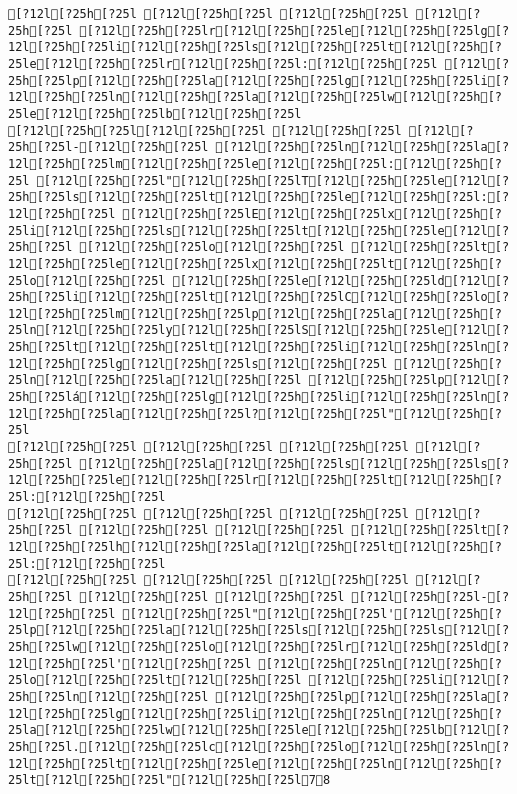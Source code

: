 \documentclass{scrartcl}
\begin{document}
\begin{Verbatim}
[?12l[?25h[?25l [?12l[?25h[?25l [?12l[?25h[?25l [?12l[?25h[?25l [?12l[?25h[?25lr[?12l[?25h[?25le[?12l[?25h[?25lg[?12l[?25h[?25li[?12l[?25h[?25ls[?12l[?25h[?25lt[?12l[?25h[?25le[?12l[?25h[?25lr[?12l[?25h[?25l:[?12l[?25h[?25l [?12l[?25h[?25lp[?12l[?25h[?25la[?12l[?25h[?25lg[?12l[?25h[?25li[?12l[?25h[?25ln[?12l[?25h[?25la[?12l[?25h[?25lw[?12l[?25h[?25le[?12l[?25h[?25lb[?12l[?25h[?25l
[?12l[?25h[?25l[?12l[?25h[?25l [?12l[?25h[?25l [?12l[?25h[?25l-[?12l[?25h[?25l [?12l[?25h[?25ln[?12l[?25h[?25la[?12l[?25h[?25lm[?12l[?25h[?25le[?12l[?25h[?25l:[?12l[?25h[?25l [?12l[?25h[?25l"[?12l[?25h[?25lT[?12l[?25h[?25le[?12l[?25h[?25ls[?12l[?25h[?25lt[?12l[?25h[?25le[?12l[?25h[?25l:[?12l[?25h[?25l [?12l[?25h[?25lE[?12l[?25h[?25lx[?12l[?25h[?25li[?12l[?25h[?25ls[?12l[?25h[?25lt[?12l[?25h[?25le[?12l[?25h[?25l [?12l[?25h[?25lo[?12l[?25h[?25l [?12l[?25h[?25lt[?12l[?25h[?25le[?12l[?25h[?25lx[?12l[?25h[?25lt[?12l[?25h[?25lo[?12l[?25h[?25l [?12l[?25h[?25le[?12l[?25h[?25ld[?12l[?25h[?25li[?12l[?25h[?25lt[?12l[?25h[?25lC[?12l[?25h[?25lo[?12l[?25h[?25lm[?12l[?25h[?25lp[?12l[?25h[?25la[?12l[?25h[?25ln[?12l[?25h[?25ly[?12l[?25h[?25lS[?12l[?25h[?25le[?12l[?25h[?25lt[?12l[?25h[?25lt[?12l[?25h[?25li[?12l[?25h[?25ln[?12l[?25h[?25lg[?12l[?25h[?25ls[?12l[?25h[?25l [?12l[?25h[?25ln[?12l[?25h[?25la[?12l[?25h[?25l [?12l[?25h[?25lp[?12l[?25h[?25lá[?12l[?25h[?25lg[?12l[?25h[?25li[?12l[?25h[?25ln[?12l[?25h[?25la[?12l[?25h[?25l?[?12l[?25h[?25l"[?12l[?25h[?25l
[?12l[?25h[?25l [?12l[?25h[?25l [?12l[?25h[?25l [?12l[?25h[?25l [?12l[?25h[?25la[?12l[?25h[?25ls[?12l[?25h[?25ls[?12l[?25h[?25le[?12l[?25h[?25lr[?12l[?25h[?25lt[?12l[?25h[?25l:[?12l[?25h[?25l
[?12l[?25h[?25l [?12l[?25h[?25l [?12l[?25h[?25l [?12l[?25h[?25l [?12l[?25h[?25l [?12l[?25h[?25l [?12l[?25h[?25lt[?12l[?25h[?25lh[?12l[?25h[?25la[?12l[?25h[?25lt[?12l[?25h[?25l:[?12l[?25h[?25l
[?12l[?25h[?25l [?12l[?25h[?25l [?12l[?25h[?25l [?12l[?25h[?25l [?12l[?25h[?25l [?12l[?25h[?25l [?12l[?25h[?25l-[?12l[?25h[?25l [?12l[?25h[?25l"[?12l[?25h[?25l'[?12l[?25h[?25lp[?12l[?25h[?25la[?12l[?25h[?25ls[?12l[?25h[?25ls[?12l[?25h[?25lw[?12l[?25h[?25lo[?12l[?25h[?25lr[?12l[?25h[?25ld[?12l[?25h[?25l'[?12l[?25h[?25l [?12l[?25h[?25ln[?12l[?25h[?25lo[?12l[?25h[?25lt[?12l[?25h[?25l [?12l[?25h[?25li[?12l[?25h[?25ln[?12l[?25h[?25l [?12l[?25h[?25lp[?12l[?25h[?25la[?12l[?25h[?25lg[?12l[?25h[?25li[?12l[?25h[?25ln[?12l[?25h[?25la[?12l[?25h[?25lw[?12l[?25h[?25le[?12l[?25h[?25lb[?12l[?25h[?25l.[?12l[?25h[?25lc[?12l[?25h[?25lo[?12l[?25h[?25ln[?12l[?25h[?25lt[?12l[?25h[?25le[?12l[?25h[?25ln[?12l[?25h[?25lt[?12l[?25h[?25l"[?12l[?25h[?25l78


\end{Verbatim}
\end{document}
